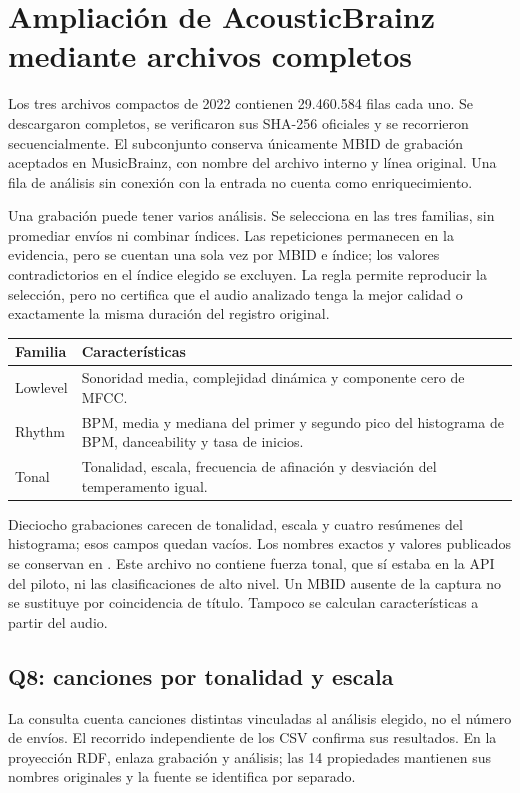 \documentclass[11pt,a4paper]{article}
\begin{document}
\newpage
\section{Ampliación de AcousticBrainz mediante archivos completos}
Los tres archivos compactos de 2022 contienen 29.460.584 filas cada uno. Se descargaron completos, se verificaron sus SHA-256 oficiales y se recorrieron secuencialmente. El subconjunto conserva únicamente MBID de grabación aceptados en MusicBrainz, con nombre del archivo interno y línea original. Una fila de análisis sin conexión con la entrada no cuenta como enriquecimiento.

Una grabación puede tener varios análisis. Se selecciona  en las tres familias, sin promediar envíos ni combinar índices. Las repeticiones permanecen en la evidencia, pero se cuentan una sola vez por MBID e índice; los valores contradictorios en el índice elegido se excluyen. La regla permite reproducir la selección, pero no certifica que el audio analizado tenga la mejor calidad o exactamente la misma duración del registro original.

\begin{center}\small
{}
\begin{tabularx}{\linewidth}{@{}p{2cm}Y@{}}
\toprule Familia & Características \\
\midrule
Lowlevel & Sonoridad media, complejidad dinámica y componente cero de MFCC. \\
Rhythm & BPM, media y mediana del primer y segundo pico del histograma de BPM, danceability y tasa de inicios. \\
Tonal & Tonalidad, escala, frecuencia de afinación y desviación del temperamento igual. \\
\bottomrule
\end{tabularx}
\end{center}
Dieciocho grabaciones carecen de tonalidad, escala y cuatro resúmenes del histograma; esos campos quedan vacíos. Los nombres exactos y valores publicados se conservan en . Este archivo no contiene fuerza tonal, que sí estaba en la API del piloto, ni las clasificaciones de alto nivel. Un MBID ausente de la captura no se sustituye por coincidencia de título. Tampoco se calculan características a partir del audio.

\subsection{Q8: canciones por tonalidad y escala}


La consulta cuenta canciones distintas vinculadas al análisis elegido, no el número de envíos. El recorrido independiente de los CSV confirma sus resultados. En la proyección RDF,  enlaza grabación y análisis; las 14 propiedades mantienen sus nombres originales y la fuente se identifica por separado.
\end{document}
